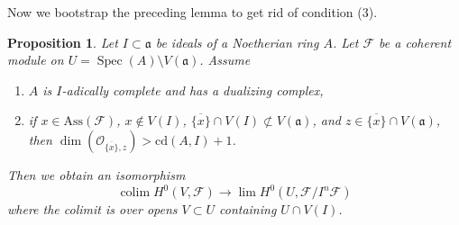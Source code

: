 \documentclass{stacks-project}
\theoremstyle{plain}
\newtheorem{proposition}[subsection]{Proposition}
\theoremstyle{definition}
\theoremstyle{remark}
\numberwithin{equation}{subsection}
\def\lim{\mathop{\mathrm{lim}}\nolimits}
\def\colim{\mathop{\mathrm{colim}}\nolimits}
\def\Spec{\mathop{\mathrm{Spec}}}
\begin{document}
\noindent
Now we bootstrap the preceding lemma to get rid of condition (3).

\begin{proposition}
\label{proposition-application-H0}
Let $I \subset \mathfrak a$ be ideals of a Noetherian ring $A$.
Let $\mathcal{F}$ be a coherent module on
$U = \Spec(A) \setminus V(\mathfrak a)$.
Assume
\begin{enumerate}
\item $A$ is $I$-adically complete and has a dualizing complex,
\item if $x \in \text{Ass}(\mathcal{F})$, $x \not \in V(I)$,
$\overline{\{x\}} \cap V(I) \not \subset V(\mathfrak a)$,
and $z \in \overline{\{x\}} \cap V(\mathfrak a)$, then
$\dim(\mathcal{O}_{\overline{\{x\}}, z}) > \text{cd}(A, I) + 1$.
\end{enumerate}
Then we obtain an isomorphism
$$
\colim H^0(V, \mathcal{F})
\longrightarrow
\lim H^0(U, \mathcal{F}/I^n\mathcal{F})
$$
where the colimit is over opens $V \subset U$ containing $U \cap V(I)$.
\end{proposition}
\end{document}

